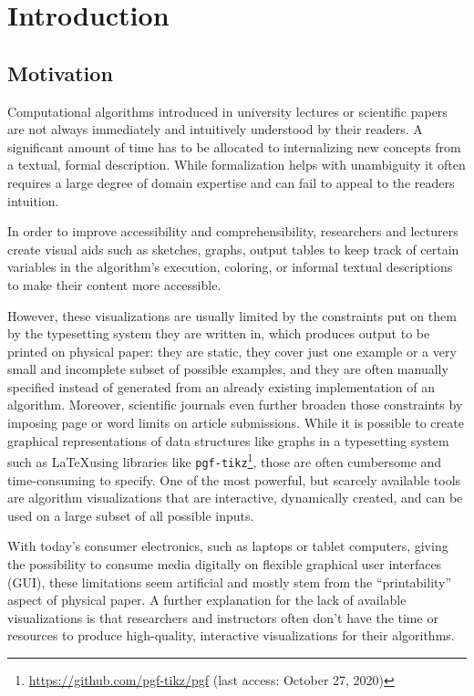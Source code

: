 \section{Introduction}

\subsection{Motivation}

Computational algorithms introduced in university lectures or scientific papers are not always immediately and intuitively understood by their readers.
A significant amount of time has to be allocated to internalizing new concepts from a textual, formal description. While formalization helps with unambiguity it often requires a large degree of domain expertise and can fail to appeal to the readers intuition.

In order to improve accessibility and comprehensibility, researchers and lecturers create visual aids such as sketches, graphs, output tables to keep track of certain variables in the algorithm's execution, coloring, or informal textual descriptions to make their content more accessible. 

However, these visualizations are usually limited by the constraints put on them by the typesetting system they are written in, which produces output to be printed on physical paper: they are static, they cover just one example or a very small and incomplete subset of possible examples, and they are often manually specified instead of generated from an already existing implementation of an algorithm. Moreover, scientific journals even further broaden those constraints by imposing page or word limits on article submissions. While it is possible to create graphical representations of data structures like graphs in a typesetting system such as \LaTeX using libraries like \texttt{pgf-tikz}\footnote{\url{https://github.com/pgf-tikz/pgf} (last access: October 27, 2020)}, those are often cumbersome and time-consuming to specify.
One of the most powerful, but scarcely available tools are algorithm visualizations that are interactive, dynamically created, and can be used on a large subset of all possible inputs. 



With today's consumer electronics, such as laptops or tablet computers, giving the possibility to consume media digitally on flexible graphical user interfaces (GUI), these limitations seem artificial and mostly stem from the ``printability'' aspect of physical paper. A further explanation for the lack of available visualizations is that researchers and instructors often don't have the time or resources to produce high-quality, interactive visualizations for their algorithms.

